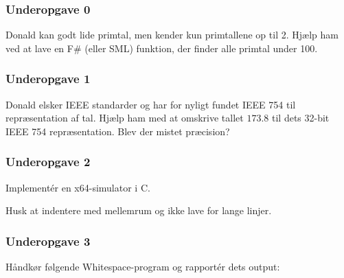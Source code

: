 \subsubsection{Underopgave 0}
\vspace{-0.2cm}

Donald kan godt lide primtal, men kender kun primtallene op til 2. Hjælp ham
ved at lave en F\# (eller SML) funktion, der finder alle primtal under 100.

\subsubsection{Underopgave 1}

Donald elsker IEEE standarder og har for nyligt fundet IEEE 754 til
repræsentation af tal. Hjælp ham med at omskrive tallet $173.8$ til dets
32-bit IEEE 754 repræsentation. Blev der mistet præcision?


\subsubsection{Underopgave 2}
\vspace{-0.2cm}

Implementér en x64-simulator i C.

Husk at indentere med mellemrum og ikke lave for lange linjer.

\newpage

\subsubsection{Underopgave 3}
\vspace{-0.2cm}

Håndkør følgende Whitespace-program og rapportér dets output:
\begin{verbatim}


\end{verbatim}

